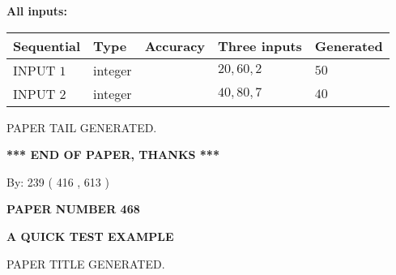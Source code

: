 \documentclass[12pt]{article}
\begin{document}
   
   
   
\noindent\vspace{0.1in}\hspace{-0.08in} {\textbf{\Large{All inputs: }}}
   
   
  
  
\noindent\begin{tabular}{|l|l|l|l|l|}
\hline
 Sequential & Type & Accuracy & Three inputs & Generated \\ 
\hline
 
 
  INPUT $  1 $ & integer &  & $
 20
 , 
 60
 , 
 2
 $ & $ 50 $ 
 \\  \hline  
 
 
  INPUT $  2 $ & integer &  & $
 40
 , 
 80
 , 
 7
 $ & $ 40 $ 
 \\  \hline  
 \end{tabular}
   
   
   
   
   
   
 \vspace{0.2in}
 
   
   
\vspace{2.0in} PAPER TAIL GENERATED.
   
   
   
   
\vspace{1.0in} 
{\textbf{\large{ *** END OF PAPER, THANKS *** }}} 
   
   
\hspace{1.0in} By: 
 239 ( 416 ,  613 )
   
   
   
   
\newpage 
\setcounter{page}{ 
   468001 } 
   
   
   
   
 {\textbf{ \Large{ PAPER NUMBER  468  }}}
   
   
\vspace{0.2in}
   
   
   
   
   
   
   
   
 \vspace{0.2in}
{\LARGE {\textbf{ A QUICK TEST EXAMPLE}}}
   
   
 PAPER TITLE GENERATED.
   
   
   
\vspace{0.2in}
   
\end{document}
